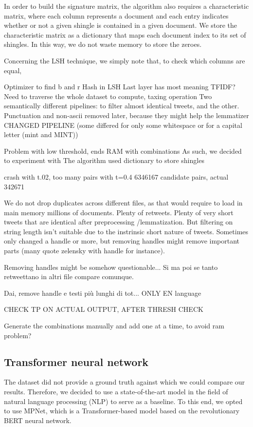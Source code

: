 \documentclass[runningheads]{llncs}
\begin{document}
In order to build the signature matrix, the algorithm also requires a characteristic matrix, where each column represents a document and each entry indicates whether or not a given shingle is contained in a given document. We store the characteristic matrix as a dictionary that maps each document index to its set of shingles. In this way, we do not waste memory to store the zeroes.

Concerning the LSH technique, we simply note that, to check which columns are equal, 

Optimizer to find b and r
Hash in LSH
Last layer has most meaning
TFIDF? Need to traverse the whole dataset to compute, taxing operation
Two semantically different pipelines: to filter almost identical tweets, and the other.
Punctuation and non-ascii removed later, because they might help the lemmatizer
CHANGED PIPELINE (some differed for only some whitespace or for a capital letter (mint and MINT))

Problem with low threshold, ends RAM with combinations
As such, we decided to experiment with   
The algorithm 
used dictionary to store shingles 

crash with t.02, too many pairs
with t=0.4 6346167 candidate pairs, actual 342671 

We do not drop duplicates across different files, as that would require to load in main memory millions of documents. Plenty of retweets. Plenty of very short tweets that are identical after preprocessing /lemmatization. But filtering on string length isn't suitable due to the instrinsic short nature of tweets.  
Sometimes only changed a handle or more, but removing handles might remove important parts (many quote zelensky with handle for instance).

Removing handles might be somehow questionable... Si ma poi se tanto retweettano in altri file compare comunque.

Dai, remove handle e testi più lunghi di tot...
ONLY EN language


CHECK TP ON ACTUAL OUTPUT, AFTER THRESH CHECK

Generate the combinations manually and add one at a time, to avoid ram problem?

\subsection{Transformer neural network}
\label{subsec:models:transformer}

The dataset did not provide a ground truth against which we could compare our results. Therefore, we decided to use a state-of-the-art model in the field of natural language processing (NLP) to serve as a baseline. To this end, we opted to use MPNet, which is a Transformer-based model based on the revolutionary BERT neural network. 
\end{document}
